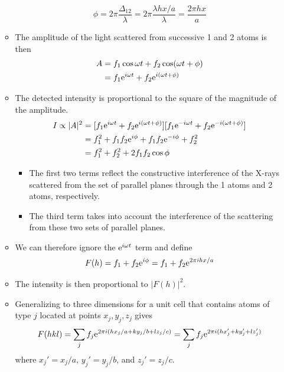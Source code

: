 \documentclass[../notes.tex]{subfiles}
\begin{document}
\begin{itemize}
\begin{itemize}
        \begin{equation*}
            \phi = 2\pi\frac{\Delta_{12}}{\lambda}
            = 2\pi\frac{\lambda hx/a}{\lambda}
            = \frac{2\pi hx}{a}
        \end{equation*}
        \item The amplitude of the light scattered from successive 1 and 2 atoms is then
        \begin{align*}
            A &= f_1\cos\omega t+f_2\cos(\omega t+\phi)\\
            &= f_1\e[i\omega t]+f_2\e[i(\omega t+\phi)]
        \end{align*}
        \item The detected intensity is proportional to the square of the magnitude of the amplitude.
        \begin{align*}
            I \propto |A|^2 &= [f_1\e[i\omega t]+f_2\e[i(\omega t+\phi)]][f_1\e[-i\omega t]+f_2\e[-i(\omega t+\phi)]]\\
            &= f_1^2+f_1f_2\e[i\phi]+f_1f_2\e[-i\phi]+f_2^2\\
            &= f_1^2+f_2^2+2f_1f_2\cos\phi
        \end{align*}
        \begin{itemize}
            \item The first two terms reflect the constructive interference of the X-rays scattered from the set of parallel planes through the 1 atoms and 2 atoms, respectively.
            \item The third term takes into account the interference of the scattering from these two sets of parallel planes.
        \end{itemize}
        \item We can therefore ignore the $\e[i\omega t]$ term and define
        \begin{equation*}
            F(h) = f_1+f_2\e[i\phi]
            = f_1+f_2\e[2\pi ihx/a]
        \end{equation*}
        \item The intensity is then proportional to $|F(h)|^2$.
        \item Generalizing to three dimensions for a unit cell that contains atoms of type $j$ located at points $x_j,y_j,z_j$ gives
        \begin{equation*}
            F(hkl) = \sum_jf_j\e[2\pi i(hx_j/a+ky_j/b+lz_j/c)]
            = \sum_jf_j\e[2\pi i(hx_j'+ky_j'+lz_j')]
        \end{equation*}
        where $x_j'=x_j/a$, $y_j'=y_j/b$, and $z_j'=z_j/c$.

\end{itemize}
\end{itemize}
\end{document}
